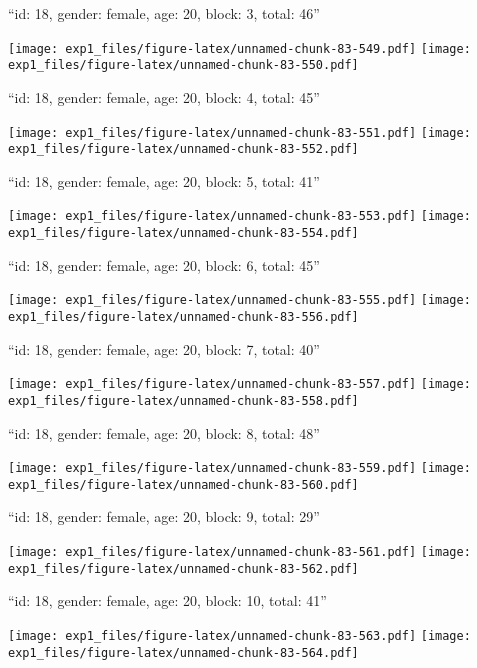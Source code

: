 \documentclass[11pt,,]{article}
\begin{document}
\newpage
[1] 

``id: 18, gender: female, age: 20, block: 3, total: 46''

\texttt{[image: exp1\_files/figure-latex/unnamed-chunk-83-549.pdf]}
\texttt{[image: exp1\_files/figure-latex/unnamed-chunk-83-550.pdf]}

\newpage
[1] 

``id: 18, gender: female, age: 20, block: 4, total: 45''

\texttt{[image: exp1\_files/figure-latex/unnamed-chunk-83-551.pdf]}
\texttt{[image: exp1\_files/figure-latex/unnamed-chunk-83-552.pdf]}

\newpage
[1] 

``id: 18, gender: female, age: 20, block: 5, total: 41''

\texttt{[image: exp1\_files/figure-latex/unnamed-chunk-83-553.pdf]}
\texttt{[image: exp1\_files/figure-latex/unnamed-chunk-83-554.pdf]}

\newpage
[1] 

``id: 18, gender: female, age: 20, block: 6, total: 45''

\texttt{[image: exp1\_files/figure-latex/unnamed-chunk-83-555.pdf]}
\texttt{[image: exp1\_files/figure-latex/unnamed-chunk-83-556.pdf]}

\newpage
[1] 

``id: 18, gender: female, age: 20, block: 7, total: 40''

\texttt{[image: exp1\_files/figure-latex/unnamed-chunk-83-557.pdf]}
\texttt{[image: exp1\_files/figure-latex/unnamed-chunk-83-558.pdf]}

\newpage
[1] 

``id: 18, gender: female, age: 20, block: 8, total: 48''

\texttt{[image: exp1\_files/figure-latex/unnamed-chunk-83-559.pdf]}
\texttt{[image: exp1\_files/figure-latex/unnamed-chunk-83-560.pdf]}

\newpage
[1] 

``id: 18, gender: female, age: 20, block: 9, total: 29''

\texttt{[image: exp1\_files/figure-latex/unnamed-chunk-83-561.pdf]}
\texttt{[image: exp1\_files/figure-latex/unnamed-chunk-83-562.pdf]}

\newpage
[1] 

``id: 18, gender: female, age: 20, block: 10, total: 41''

\texttt{[image: exp1\_files/figure-latex/unnamed-chunk-83-563.pdf]}
\texttt{[image: exp1\_files/figure-latex/unnamed-chunk-83-564.pdf]}
\end{document}
